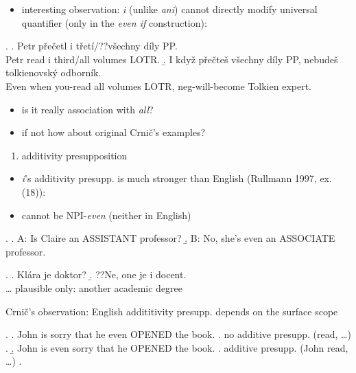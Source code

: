 \documentclass[ignorenonframetext,]{beamer}
\providecommand{\tightlist}{%
  \setlength{\itemsep}{0pt}\setlength{\parskip}{0pt}}
\begin{document}
\begin{frame}

\begin{itemize}
\tightlist
\item
  interesting observation: \emph{i} (unlike \emph{ani}) cannot directly
  modify universal quantifier (only in the \emph{even if} construction):
\end{itemize}

\ex. \a. Petr přečetl i třetí/??všechny díly PP.\\
Petr read i third/all volumes LOTR. \b. I když přečteš všechny díly PP,
nebudeš tolkienovský odborník.\\
Even when you-read all volumes LOTR, neg-will-become Tolkien expert.

\begin{itemize}
\tightlist
\item
  is it really association with \emph{all}?
\item
  if not how about original Crnič's examples?
\end{itemize}

\end{frame}

\begin{frame}

\begin{enumerate}
\def\labelenumi{\arabic{enumi})}
\setcounter{enumi}{1}
\tightlist
\item
  additivity presupposition
\end{enumerate}

\begin{itemize}
\tightlist
\item
  \emph{i}'s additivity presupp. is much stronger than English (Rullmann
  1997, ex.(18)):
\item
  cannot be NPI-\emph{even} (neither in English)
\end{itemize}

\ex. \a. A: Is Claire an ASSISTANT professor? \b. B: No, she's even an
ASSOCIATE professor.

\ex. \a. Klára je doktor? \b. ??Ne, one je i docent.\\
\ldots{} plausible only: another academic degree

\end{frame}

\begin{frame}

Crnič's observation: English addititivity presupp. depends on the
surface scope

\ex. \a. John is sorry that he even OPENED the book. \a. no additive
presupp. (read, \ldots{}) \z. \b. John is even sorry that he OPENED the
book. \a. additive presupp. (John read, \ldots{}) \z.

\end{frame}
\end{document}
